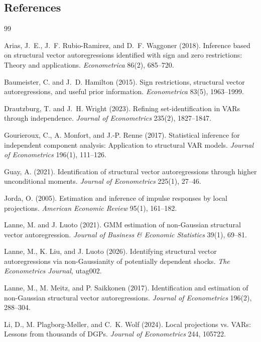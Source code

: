 \documentclass[11pt]{article}
\theoremstyle{definition}
\theoremstyle{plain}
\theoremstyle{remark}
\begin{document}
\subsection*{References}
\begin{thebibliography}{99}

Arias, J.~E., J.~F. Rubio-Ramirez, and D.~F. Waggoner (2018).
Inference based on structural vector autoregressions identified with sign and
zero restrictions: Theory and applications.
\emph{Econometrica} 86(2), 685--720.

Baumeister, C. and J.~D. Hamilton (2015).
Sign restrictions, structural vector autoregressions, and useful prior
information.
\emph{Econometrica} 83(5), 1963--1999.

Drautzburg, T. and J.~H. Wright (2023).
Refining set-identification in VARs through independence.
\emph{Journal of Econometrics} 235(2), 1827--1847.

Gourieroux, C., A. Monfort, and J.-P. Renne (2017).
Statistical inference for independent component analysis: Application to
structural VAR models.
\emph{Journal of Econometrics} 196(1), 111--126.

Guay, A. (2021).
Identification of structural vector autoregressions through higher
unconditional moments.
\emph{Journal of Econometrics} 225(1), 27--46.

Jorda, O. (2005).
Estimation and inference of impulse responses by local projections.
\emph{American Economic Review} 95(1), 161--182.

Lanne, M. and J. Luoto (2021).
GMM estimation of non-Gaussian structural vector autoregression.
\emph{Journal of Business \& Economic Statistics} 39(1), 69--81.

Lanne, M., K. Liu, and J. Luoto (2026).
Identifying structural vector autoregressions via non-Gaussianity of
potentially dependent shocks.
\emph{The Econometrics Journal}, utag002.

Lanne, M., M. Meitz, and P. Saikkonen (2017).
Identification and estimation of non-Gaussian structural vector
autoregressions.
\emph{Journal of Econometrics} 196(2), 288--304.

Li, D., M. Plagborg-M{\o}ller, and C.~K. Wolf (2024).
Local projections vs. VARs: Lessons from thousands of DGPs.
\emph{Journal of Econometrics} 244, 105722.


\end{thebibliography}
\end{document}
